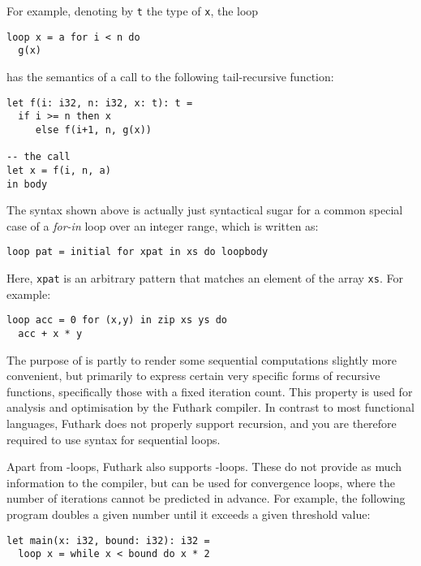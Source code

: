 \documentclass[oneside,11pt]{book}
\begin{document}
For example, denoting by \texttt{t} the type of \texttt{x}, the
loop

\begin{lstlisting}
loop x = a for i < n do
  g(x)
\end{lstlisting}

\noindent
has the semantics of a call to the following tail-recursive function:

\begin{lstlisting}
let f(i: i32, n: i32, x: t): t =
  if i >= n then x
     else f(i+1, n, g(x))

-- the call
let x = f(i, n, a)
in body
\end{lstlisting}

The  syntax shown above is actually just syntactical sugar
for a common special case of a \textit{for-in} loop over an integer
range, which is written as:

\begin{lstlisting}
loop pat = initial for xpat in xs do loopbody
\end{lstlisting}

Here, \texttt{xpat} is an arbitrary pattern that matches an element of
the array \texttt{xs}.  For example:

\begin{lstlisting}
loop acc = 0 for (x,y) in zip xs ys do
  acc + x * y
\end{lstlisting}

The purpose of  is partly to render some sequential
computations slightly more convenient, but primarily to express
certain very specific forms of recursive functions, specifically those
with a fixed iteration count.  This property is used for analysis and
optimisation by the Futhark compiler.  In contrast to most functional
languages, Futhark does not properly support recursion, and you are
therefore required to use  syntax for sequential loops.

Apart from -loops, Futhark also supports -loops.
These do not provide as much information to the compiler, but can be
used for convergence loops, where the number of iterations cannot be
predicted in advance.  For example, the following program doubles a
given number until it exceeds a given threshold value:

\begin{lstlisting}
let main(x: i32, bound: i32): i32 =
  loop x = while x < bound do x * 2
\end{lstlisting}
\end{document}

